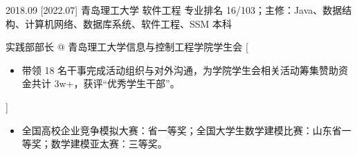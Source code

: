 \documentclass[zh]{resume}
\begin{document}
\begin{educations}
  \education%
    {2018.09}%
    [2022.07]%
    {青岛理工大学}%
    {软件工程}%
    {专业排名 16/103；主修：Java、数据结构、计算机网络、数据库系统、软件工程、SSM}%
    {本科}
\end{educations}

\begin{experiences}
    {实践部部长 @ 青岛理工大学信息与控制工程学院学生会}%
    [\begin{itemize}
      \item 带领 18 名干事完成活动组织与对外沟通，为学院学生会相关活动筹集赞助资金共计 3w+，获评“优秀学生干部”。
    \end{itemize}]
\end{experiences}

\begin{itemize}
  \item 全国高校企业竞争模拟大赛：省一等奖；全国大学生数学建模比赛：山东省一等奖；数学建模亚太赛：三等奖。
\end{itemize}
\end{document}
